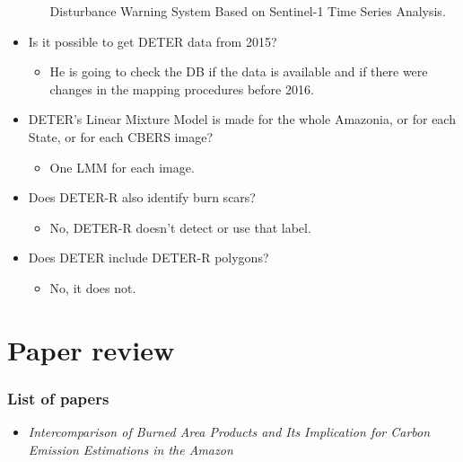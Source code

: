 \documentclass{beamer}
\begin{document}
\begin{frame}[t, allowframebreaks]
\begin{itemize}
\begin{itemize}
                Disturbance Warning System Based on Sentinel-1 Time Series 
                Analysis.
        \end{itemize}
        \item Is it possible to get DETER data from 2015? 
        \begin{itemize}
            \item He is going to check the DB if the data is available and if
                there were changes in the mapping procedures before 2016.
        \end{itemize}
        \item DETER's Linear Mixture Model is made for the whole Amazonia, or
            for each State, or for each CBERS image?
        \begin{itemize}
            \item One LMM for each image.
        \end{itemize}
        \item Does DETER-R also identify burn scars? 
        \begin{itemize}
            \item No, DETER-R doesn't detect or use that label.
        \end{itemize}
        \item Does DETER include DETER-R polygons?
        \begin{itemize}
            \item No, it does not.
        \end{itemize}
    \end{itemize}
\end{frame}



\section{Paper review}

\begin{frame}
    \frametitle{List of papers}
    \begin{itemize}
        \item \textit{Intercomparison of Burned Area Products and Its 
            Implication for Carbon Emission Estimations in the Amazon}
    \end{itemize}
\end{frame}
\end{document}

